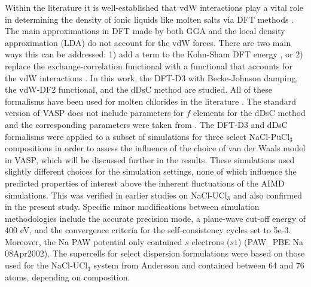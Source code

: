 \documentclass[review]{elsarticle}
\begin{document}
Within the literature it is well-established that vdW interactions play a vital role in determining the density of ionic liquids like molten salts via DFT methods \cite{NAM2015224, Bengston2014, duemmler_liclkcl, duemmler_naclmgcl, ANDERSSON2022153836}. The main approximations in DFT made by both GGA and the local density approximation (LDA) do not account for the vdW forces. There are two main ways this can be addressed: 1) add a term to the Kohn-Sham DFT energy \cite{Grimme2006, Grimme2010}, or 2) replace the exchange-correlation functional with a functional that accounts for the vdW interactions \cite{Dion2004}. In this work, the DFT-D3 with Becke-Johnson damping, the vdW-DF2 functional, and the dDsC method are studied. All of these formalisms have been used for molten chlorides in the literature \cite{li2021molecular, duemmler_liclkcl, duemmler_naclmgcl, Dion2004, ANDERSSON2022153836}. The standard version of VASP does not include parameters for $f$ elements for the dDsC method and the corresponding parameters were taken from \cite{kim2012universal, schwerdtfeger2019table}. The DFT-D3 and dDsC formalisms were applied to a subset of simulations for three select NaCl-PuCl$_3$ compositions in order to assess the influence of the choice of van der Waals model in VASP, which will be discussed further in the results. These simulations used slightly different choices for the simulation settings, none of which influence the predicted properties of interest above the inherent fluctuations of the AIMD simulations. This was verified in earlier studies on NaCl-UCl$_3$ \cite{ANDERSSON2022153836} and also confirmed in the present study. Specific minor modifications between simulation methodologies include the accurate precision mode, a plane-wave cut-off energy of 400 eV, and the convergence criteria for the self-consistency cycles set to 5e-3. Moreover, the Na PAW potential only contained $s$ electrons ($s1$) (PAW\_PBE Na 08Apr2002). The supercells for select dispersion formulations were based on those used for the NaCl-UCl$_3$ system from Andersson \cite{ANDERSSON2022153836} and contained between 64 and 76 atoms, depending on composition.
\end{document}
